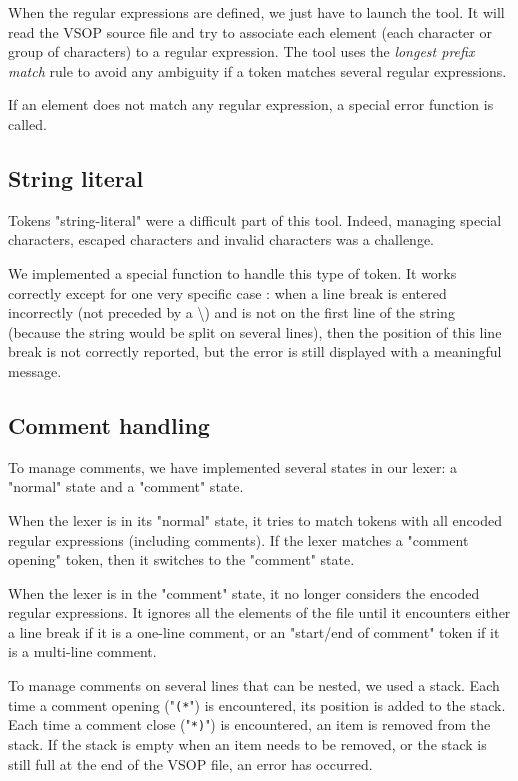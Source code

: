 \documentclass[a4paper, 12pt]{article}
\begin{document}
    When the regular expressions are defined, we just have to launch the tool. It will read the VSOP source file and try to associate each element (each character or group of characters) to a regular expression. The tool uses the {\it longest prefix match} rule to avoid any ambiguity if a token matches several regular expressions.
    
    If an element does not match any regular expression, a special error function is called.
    
    \subsection{String literal}
    
    Tokens "string-literal" were a difficult part of this tool. Indeed, managing special characters, escaped characters and invalid characters was a challenge.
    
    We implemented a special function to handle this type of token. It works correctly except for one very specific case : when a line break is entered incorrectly (not preceded by a \textbackslash) and is not on the first line of the string (because the string would be split on several lines), then the position of this line break is not correctly reported, but the error is still displayed with a meaningful message.
    
    \subsection{Comment handling}
    
    To manage comments, we have implemented several states in our lexer: a "normal" state and a "comment" state.
    
    When the lexer is in its "normal" state, it tries to match tokens with all encoded regular expressions (including comments). If the lexer matches a "comment opening" token, then it switches to the "comment" state.
    
    When the lexer is in the "comment" state, it no longer considers the encoded regular expressions. It ignores all the elements of the file until it encounters either a line break if it is a one-line comment, or an "start/end of comment" token if it is a multi-line comment.
    
    To manage comments on several lines that can be nested, we used a stack. Each time a comment opening ("\texttt{(*}") is encountered, its position is added to the stack. Each time a comment close ("\texttt{*)}") is encountered, an item is removed from the stack. If the stack is empty when an item needs to be removed, or the stack is still full at the end of the VSOP file, an error has occurred.
    
\end{document}
